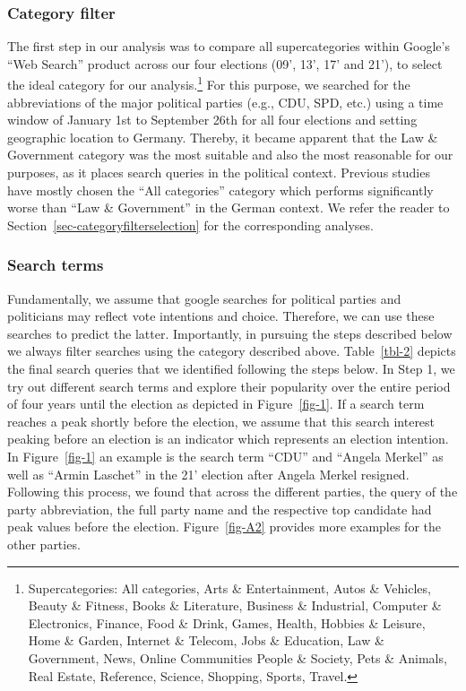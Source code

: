 \documentclass[
  letterpaper,
  DIV=11,
  numbers=noendperiod]{scrartcl}
\begin{document}
\hypertarget{sec-categoryfilter}{%
\subsubsection{Category filter}\label{sec-categoryfilter}}

The first step in our analysis was to compare all supercategories within
Google's ``Web Search'' product across our four elections (09', 13', 17'
and 21'), to select the ideal category for our analysis.\footnote{Supercategories:
  All categories, Arts \& Entertainment, Autos \& Vehicles, Beauty \&
  Fitness, Books \& Literature, Business \& Industrial, Computer \&
  Electronics, Finance, Food \& Drink, Games, Health, Hobbies \&
  Leisure, Home \& Garden, Internet \& Telecom, Jobs \& Education, Law
  \& Government, News, Online Communities People \& Society, Pets \&
  Animals, Real Estate, Reference, Science, Shopping, Sports, Travel.}
For this purpose, we searched for the abbreviations of the major
political parties (e.g., CDU, SPD, etc.) using a time window of January
1st to September 26th for all four elections and setting geographic
location to Germany. Thereby, it became apparent that the Law \&
Government category was the most suitable and also the most reasonable
for our purposes, as it places search queries in the political context.
Previous studies have mostly chosen the ``All categories'' category
which performs significantly worse than ``Law \& Government'' in the
German context. We refer the reader to
Section~\ref{sec-categoryfilterselection} for the corresponding
analyses.

\hypertarget{search-terms}{%
\subsubsection{Search terms}\label{search-terms}}

Fundamentally, we assume that google searches for political parties and
politicians may reflect vote intentions and choice. Therefore, we can
use these searches to predict the latter. Importantly, in pursuing the
steps described below we always filter searches using the category
described above. Table~\ref{tbl-2} depicts the final search queries that
we identified following the steps below. In Step 1, we try out different
search terms and explore their popularity over the entire period of four
years until the election as depicted in Figure~\ref{fig-1}. If a search
term reaches a peak shortly before the election, we assume that this
search interest peaking before an election is an indicator which
represents an election intention. In Figure~\ref{fig-1} an example is
the search term ``CDU'' and ``Angela Merkel'' as well as ``Armin
Laschet'' in the 21' election after Angela Merkel resigned. Following
this process, we found that across the different parties, the query of
the party abbreviation, the full party name and the respective top
candidate had peak values before the election. Figure~\ref{fig-A2}
provides more examples for the other parties.
\end{document}
